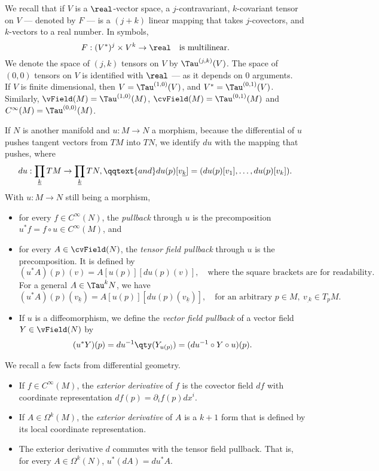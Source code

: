 \documentclass[../main-v2-manifolds.tex]{subfiles}
\begin{document}
\begin{note}
    We recall that if $V$ is a $\real$-vector space, a $j$-contravariant, $k$-covariant tensor on $V$ --- denoted by $F$ --- is a $(j+k)$ linear mapping that takes $j$-covectors, and $k$-vectors to a real number. In symbols,
    \[
        F: (V^*)^j \times V^k\to\real\quad\text{is multilinear.}
    \]
    We denote the space of $(j,k)$ tensors on $V$ by $\Tau^{(j,k)}(V)$. The space of $(0,0)$ tensors on $V$ is identified with $\real$ --- as it depends on $0$ arguments. \\
    
    If $V$ is finite dimensional, then $V=\Tau^{(1,0)}(V)$, and $V^* = \Tau^{(0,1)}(V)$.
    Similarly, $\vField(M) = \Tau^{(1,0)}(M)$,  $\cvField(M) = \Tau^{(0,1)}(M)$ and $C^\infty(M) = \Tau^{(0,0)}(M)$.
\end{note}
If $N$ is another manifold and $u: M\to N$ a morphism, because the differential of $u$ pushes tangent vectors from $TM$ into $TN$, we identify $du$ with the mapping that pushes, where
\[
    du: \prod_{\underline{k}}TM\to \prod_{\underline{k}}TN,\qqtext{and}du(p)[v_{\underline{k}}] = (du(p)[v_{1}],\ldots, du(p)[v_k]).
\]
With $u: M\to N$ still being a morphism, 
\begin{itemize}
    \item for every $f\in C^\infty(N)$, the \emph{pullback} through $u$ is the precomposition $u^*f = f\circ u\in C^\infty(M)$, and
    \item for every $A\in\cvField(N)$, the \emph{tensor field pullback} through $u$ is the precomposition.  It is defined by
    \[
        (u^*A)(p)(v) = A[u(p)][du(p)(v)],\quad\text{where the square brackets are for readability.}
    \]
    For a general $A\in \Tau^{k}N$, we have
    \[
        (u^*A)(p)(v_{\underline{k}}) = A[u(p)][du(p)(v_{\underline{k}})],\quad\text{for an arbitrary }p\in M,\: v_{\underline{}k}\in T_pM.
    \]
    \item If $u$ is a diffeomorphism, we define the \emph{vector field pullback} of a vector field $Y\in\vField(N)$ by
    \[
        (u^*Y)(p) = du^{-1}\qty(Y_{u(p)}) = (du^{-1}\circ Y\circ u)(p).
    \]
\end{itemize}
We recall a few facts from differential geometry.
\begin{itemize}
    \item If $f\in C^\infty(M)$, the \emph{exterior derivative} of $f$ is the covector field $df$ with coordinate representation $df(p) = \partial_i f(p) dx^i$.
    \item If $A\in \Omega^k(M)$, the \emph{exterior derivative} of $A$ is a $k+1$ form that is defined by its local coordinate representation. 
    \item The exterior derivative $d$ commutes with the tensor field pullback. That is, for every $A\in \Omega^k(N)$, $u^*(dA) = du^*A$.
\end{itemize}
\end{document}
